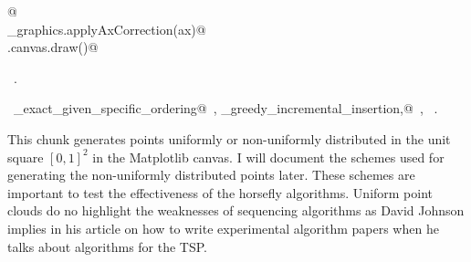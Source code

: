 \documentclass[11.5pt]{report}
\begin{document}
\begin{flushleft}
\begin{list}{}{}
\mbox{}\verb@     @\\
\mbox{}\verb@utils_graphics.applyAxCorrection(ax)@\\
\mbox{}\verb@fig.canvas.draw()@\\
\mbox{}\verb@@{\NWsep}
\end{list}
\vspace{-1.5ex}
\footnotesize
\begin{list}{}{\setlength{\itemsep}{-\parsep}\setlength{\itemindent}{-\leftmargin}}
\item \NWtxtMacroRefIn\ .
\item \NWtxtIdentsUsed\nobreak\  \verb@algo_exact_given_specific_ordering@\nobreak\ , \verb@algo_greedy_incremental_insertion,@\nobreak\ , \verb@plotTour@\nobreak\ .
\item{}
\end{list}
\vspace{4ex}
\end{flushleft}
\vspace{-0.8cm}\newchunk This chunk generates points uniformly or non-uniformly distributed in the 
unit square $[0,1]^2$ in the Matplotlib canvas. I will document the schemes used for 
generating the non-uniformly distributed points later. These schemes are important to test the effectiveness of 
the horsefly algorithms. Uniform point clouds do no highlight the weaknesses of 
sequencing algorithms as David Johnson implies in his article on how to write 
experimental algorithm papers when he talks about algorithms for the TSP. 
\end{document}
